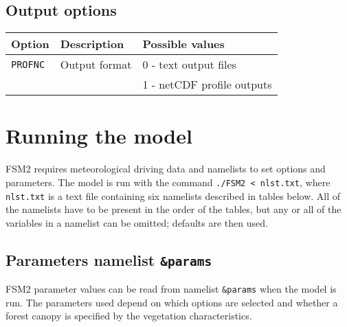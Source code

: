 \documentclass{article}
\begin{document}
\subsection{Output options }
\begin{longtable}{|l|l|l|} \hline
Option       & Description & Possible values \\ \hline
{\tt PROFNC} & Output format
&   0 - text output files               \\
& & 1 - netCDF profile outputs          \\ \hline
\end{longtable}

\section{Running the model}

FSM2 requires meteorological driving data and namelists to set options and parameters. The model is run with the command {\tt ./FSM2 < nlst.txt}, where {\tt nlst.txt} is a text file containing six namelists described in tables below. All of the namelists have to be present in the order of the tables, but any or all of the variables in a namelist can be omitted; defaults are then used.

\subsection{Parameters namelist {\tt \&params}}

FSM2 parameter values can be read from namelist {\tt \&params} when the model is run. The parameters used depend on which options are selected and whether a forest canopy is specified by the vegetation characteristics.
\end{document}

